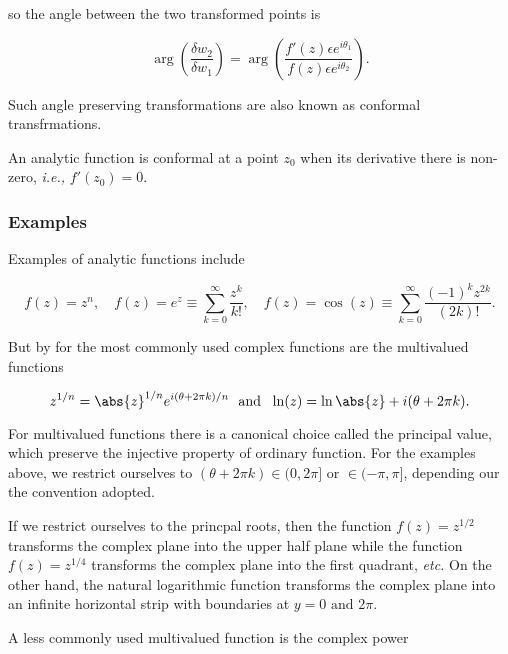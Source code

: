 \documentclass[english,a4paper,12pt]{report}
\begin{document}
so the angle between the two transformed points is 

\begin{equation}
    \arg \left( \frac{\delta w_2 }{\delta w_1 }  \right) = \arg \left( \frac{f'(z)\epsilon e^{i \theta _{1} } }{f(z)\epsilon e^{i \theta _{2} } }  \right).
\end{equation}

Such angle preserving transformations are also known as conformal transfrmations.

An analytic function is conformal at a point \(z_0 \) when its derivative there is non-zero, \textit{i.e.,} \(f'(z_0 )=0\).  

\subsubsection{Examples}

Examples of analytic functions include 

\begin{equation}
    f(z) = z^{n}, \quad f(z) = e^{z} \equiv \sum_{k=0}^{\infty} \frac{z^{k} }{k!}, \quad f(z) = \cos (z) \equiv \sum_{k=0}^{\infty} \frac{(-1)^{k}z^{2k}  }{(2k)!}.   
\end{equation}

But by for the most commonly used complex functions are the multivalued functions

\begin{equation}
    z^{1 /n } = \abs{z}^{1 /n}  e^{i(\theta + 2\pi k) /n} ~\text { and }~ \ln (z) = \ln \abs{z} + i (\theta + 2\pi k).
\end{equation}

For multivalued functions there is a canonical choice called the principal value, which preserve the injective property of ordinary function. For the examples above, we restrict ourselves to \((\theta +2\pi k) \in (0,2\pi ] \text { or } \in (-\pi ,\pi ]\), depending our the convention adopted. 

If we restrict ourselves to the princpal roots, then the function \(f(z) = z ^{1 /2} \) transforms the complex plane into the upper half plane while the function \(f(z) = z^{1 /4} \) transforms the complex plane into the first quadrant, \textit{etc.} On the other hand, the natural logarithmic function transforms the complex plane into an infinite horizontal strip with boundaries at \(y = 0 \text { and } 2\pi\).   

A less commonly used multivalued function is the complex power
\end{document}

